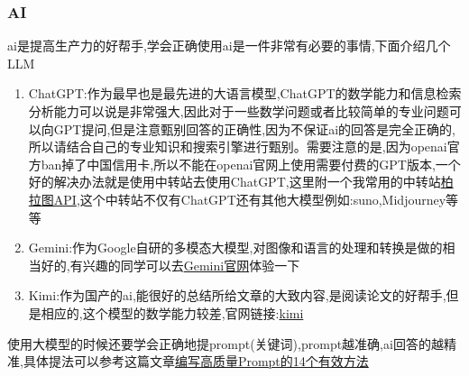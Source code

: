 \documentclass{ctexart}
\begin{document}
\subsubsection{AI}
ai是提高生产力的好帮手,学会正确使用ai是一件非常有必要的事情,下面介绍几个LLM
\begin{enumerate}
    \item ChatGPT:作为最早也是最先进的大语言模型,ChatGPT的数学能力和信息检索分析能力可以说是非常强大,因此对于一些数学问题或者比较简单的专业问题可以向GPT提问,但是注意甄别回答的正确性,因为不保证ai的回答是完全正确的,所以请结合自己的专业知识和搜索引擎进行甄别。需要注意的是,因为openai官方ban掉了中国信用卡,所以不能在openai官网上使用需要付费的GPT版本,一个好的解决办法就是使用中转站去使用ChatGPT,这里附一个我常用的中转站\href{https://api.bltcy.ai/}{柏拉图API},这个中转站不仅有ChatGPT还有其他大模型例如:suno,Midjourney等等
    \item Gemini:作为Google自研的多模态大模型,对图像和语言的处理和转换是做的相当好的,有兴趣的同学可以去\href{https://gemini.google.com/app?hl=zh-cn}{Gemini官网}体验一下%
    \item Kimi:作为国产的ai,能很好的总结所给文章的大致内容,是阅读论文的好帮手,但是相应的,这个模型的数学能力较差,官网链接:\href{https://kimi.moonshot.cn/}{kimi}
\end{enumerate}
\par 使用大模型的时候还要学会正确地提prompt(关键词),prompt越准确,ai回答的越精准,具体提法可以参考这篇文章\href{https://zhuanlan.zhihu.com/p/660369244}{编写高质量Prompt的14个有效方法
}
\end{document}
